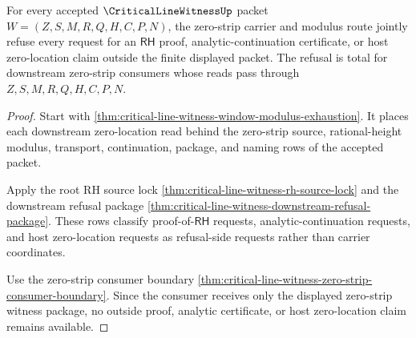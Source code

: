 \begin{theorem}
\label{thm:critical-line-witness-zero-strip-refusal-totality}
For every accepted $\CriticalLineWitnessUp$ packet $W=(Z,S,M,R,Q,H,C,P,N)$, the zero-strip carrier and modulus route jointly refuse every request for an $\mathsf{RH}$ proof, analytic-continuation certificate, or host zero-location claim outside the finite displayed packet. The refusal is total for downstream zero-strip consumers whose reads pass through $Z,S,M,R,Q,H,C,P,N$.
\end{theorem}
\begin{proof}
Start with \autoref{thm:critical-line-witness-window-modulus-exhaustion}. It places each downstream zero-location read behind the zero-strip source, rational-height modulus, transport, continuation, package, and naming rows of the accepted packet.

Apply the root RH source lock \autoref{thm:critical-line-witness-rh-source-lock} and the downstream refusal package \autoref{thm:critical-line-witness-downstream-refusal-package}. These rows classify proof-of-$\mathsf{RH}$ requests, analytic-continuation requests, and host zero-location requests as refusal-side requests rather than carrier coordinates.

Use the zero-strip consumer boundary \autoref{thm:critical-line-witness-zero-strip-consumer-boundary}. Since the consumer receives only the displayed zero-strip witness package, no outside proof, analytic certificate, or host zero-location claim remains available.
\end{proof}

